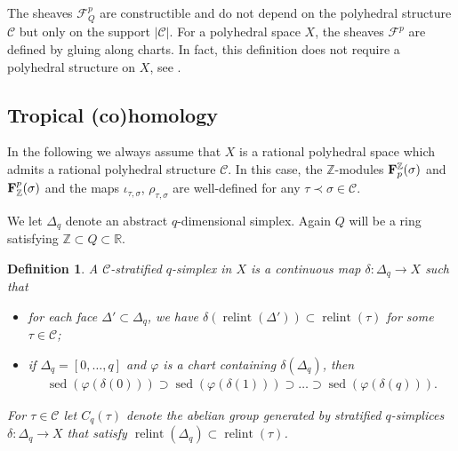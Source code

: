 \documentclass[11pt]{article}
\numberwithin{equation}{numsection}
\newcommand{\Z}{{\mathbb Z}}
\newcommand{\CC}{{\mathcal C}}
\newcommand{\R}{{\mathbb R}}
\newcommand{\F}{{\mathcal F}}
\newcommand{\imap}{\iota_{\tau,\sigma}}
\newcommand{\rmap}{\rho_{\tau,\sigma}}
\DeclareMathOperator{\relint}{relint}
\DeclareMathOperator{\sed}{sed}
\newtheorem{defn}[thm]{Definition}
\begin{document}
The sheaves $\F^p_Q$ are constructible and  do not depend on the polyhedral structure $\CC$ but only on the support $|\CC|$. 
For a polyhedral space $X$, the sheaves $\mathcal{F}^p$ are defined by gluing along charts. 
In fact, this definition does not require a polyhedral structure on $X$,  see \cite{JSS}.



\subsection{Tropical (co)homology}


In the following we always assume that $X$ is a rational polyhedral space 
which admits a rational polyhedral structure $\CC$.
In this case, the $\Z$-modules ${\bf F}^{\Z}_p(\sigma)$ and ${\bf F}_{\Z}^p(\sigma)$
and the maps $\imap$, $\rmap$ are well-defined for any $\tau \prec \sigma \in \CC$.

We let $\Delta_q$ denote an abstract $q$-dimensional simplex. 
Again $Q$ will be a ring satisfying  $\Z \subset Q \subset \R$.



\begin{defn}\label{def:stratsimp}
A \emph{$\CC$-stratified $q$-simplex} in $X$ is a continuous map $\delta \colon \Delta_q\to X$
such that
\begin{itemize}
\item 
for each face $\Delta' \subset \Delta_q$, we have  $\delta(\relint(\Delta')) \subset \relint(\tau)$ for some $\tau \in \CC$; 
\item 
if $\Delta_q = [0, \ldots, q]$ and $\varphi$ is a chart containing 
$\delta(\Delta_q)$, then 
\begin{align*}
\sed(\varphi(\delta(0))) \supset \sed(\varphi(\delta(1))) \supset \ldots \supset \sed(\varphi(\delta(q))).
\end{align*}
\end{itemize} 

For $\tau \in \CC$ let $C_q(\tau)$ denote the abelian group generated by stratified $q$-simplices 
$\delta \colon \Delta_q \to X$ that satisfy $\relint(\Delta_q) \subset \relint(\tau)$. 
\end{defn}
\end{document}
